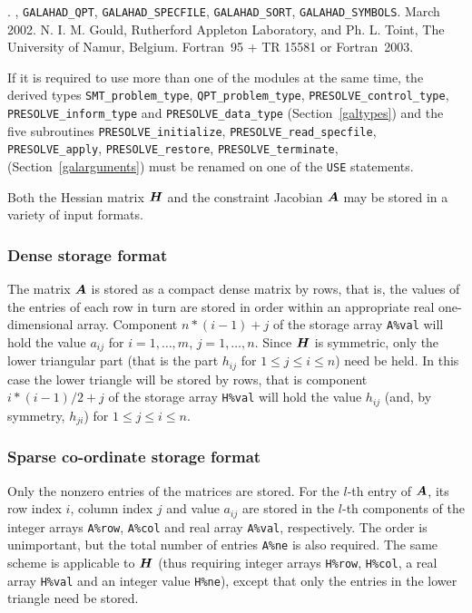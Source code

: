 \documentclass{galahad}
\newcommand{\packagename}{PRESOLVE}
\newcommand{\fullpackagename}{\libraryname\_\packagename}
\begin{document}
\galattributes
\galversions{\tt  \fullpackagename\_single, \fullpackagename\_double}.
, {\tt GAL\-AHAD\_QPT}, {\tt GALAHAD\_SPECFILE},
{\tt GALAHAD\_SORT}, {\tt GALAHAD\_SYMBOLS}.
\galdate March 2002.
\galorigin N. I. M. Gould, Rutherford Appleton Laboratory, and
Ph. L. Toint, The University of Namur, Belgium.
\gallanguage Fortran~95 + TR 15581 or Fortran~2003.


\galhowto



\noindent
If it is required to use more than one of the modules at the same time, 
the derived types
{\tt SMT\_problem\_type},
{\tt QPT\_problem\_type},
{\tt \packagename\_control\_type},
{\tt \packagename\_inform\_type}
and
{\tt \packagename\_data\_type}
(Section~\ref{galtypes})
and the five subroutines
{\tt \packagename\_initialize},
{\tt \packagename\_read\_specfile},
{\tt \packagename\_apply},
{\tt \packagename\_restore},
{\tt \packagename\_terminate},
(Section~\ref{galarguments})
must be renamed on one of the {\tt USE} statements.


\galmatrix

Both the Hessian matrix ${\bm{H}}$ and the constraint Jacobian ${\bm{A}}$
may be stored in a variety of input formats.

\subsubsection{Dense storage format}\label{dense}
The matrix ${\bm{A}}$ is stored as a compact
dense matrix by rows, that is, the values of the entries of each row in turn are
stored in order within an appropriate real one-dimensional array.
Component $n \ast (i-1) + j$ of the storage array {\tt A\%val} will hold the
value $a_{ij}$ for $i = 1, \ldots , m$, $j = 1, \ldots , n$.
Since ${\bm{H}}$ is symmetric, only the lower triangular part (that is the part
$h_{ij}$ for $1 \leq j \leq i \leq n$) need be held. In this case
the lower triangle will be stored by rows, that is
component $i \ast (i-1)/2 + j$ of the storage array {\tt H\%val}
will hold the value $h_{ij}$ (and, by symmetry, $h_{ji}$)
for $1 \leq j \leq i \leq n$.

\subsubsection{Sparse co-ordinate storage format}\label{coordinate}
Only the nonzero entries of the matrices are stored. For the
$l$-th entry of ${\bm{A}}$, its row index $i$, column index $j$
and value $a_{ij}$
are stored in the $l$-th components of the integer arrays {\tt A\%row},
{\tt A\%col} and real array {\tt A\%val}, respectively.
The order is unimportant, but the total
number of entries {\tt A\%ne} is also required.
The same scheme is applicable to
${\bm{H}}$ (thus requiring integer arrays {\tt H\%row}, {\tt H\%col}, a real array
{\tt H\%val} and an integer value {\tt H\%ne}),
except that only the entries in the lower triangle need be stored.
\end{document}
